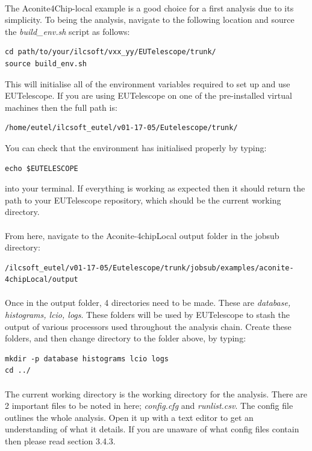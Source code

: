 \documentclass[11pt]{article}
\begin{document}
\paragraph{}
The Aconite4Chip-local example is a good choice for a first analysis due to its simplicity. To being the analysis, navigate to the following location and source the \textit{build\_env.sh} script as follows:
\begin{verbatim}
cd path/to/your/ilcsoft/vxx_yy/EUTelescope/trunk/
source build_env.sh
\end{verbatim}
This will initialise all of the environment variables required to set up and use EUTelescope. If you are using EUTelescope on one of the pre-installed virtual machines then the full path is:
\begin{verbatim}
/home/eutel/ilcsoft_eutel/v01-17-05/Eutelescope/trunk/
\end{verbatim}
You can check that the environment has initialised properly by typing:
\begin{verbatim}
echo $EUTELESCOPE
\end{verbatim}
into your terminal. If everything is working as expected then it should return the path to your EUTelescope repository, which should be the current working directory.
\paragraph{}
From here, navigate to the Aconite-4chipLocal output folder in the jobsub directory:
\begin{verbatim}
/ilcsoft_eutel/v01-17-05/Eutelescope/trunk/jobsub/examples/aconite-4chipLocal/output
\end{verbatim}
\paragraph{}
Once in the output folder, 4 directories need to be made. These are \textit{database, histograms, lcio, logs}. These folders will be used by EUTelescope to stash the output of various processors used throughout the analysis chain. Create these folders, and then change directory to the folder above, by typing:
\begin{verbatim}
mkdir -p database histograms lcio logs
cd ../
\end{verbatim}
\paragraph{}
The current working directory is the working directory for the analysis. There are 2 important files to be noted in here; \textit{config.cfg} and \textit{runlist.csv}. The config file outlines the whole analysis. Open it up with a text editor to get an understanding of what it details. If you are unaware of what config files contain then please read section 3.4.3. 
\end{document}
